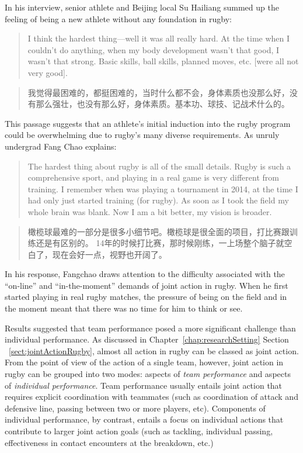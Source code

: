\begin{CJK}{UTF8}{gbsn}
In his interview, senior athlete and Beijing local Su Hailiang summed up the feeling of being a new athlete without any foundation in rugby:

\begin{quote}
    I think the hardest thing---well it was all really hard.  At the time when I couldn't do anything, when my body development wasn't that good, I wasn't that strong.  Basic skills, ball skills, planned moves, etc. [were all not very good].
\end{quote}

\begin{quote}
    我觉得最困难的，都挺困难的，当时什么都不会，身体素质也没那么好，没有那么强壮，也没有那么好，身体素质。基本功、球技、记战术什么的。
\end{quote}

This passage suggests that an athlete's initial induction into the rugby program could be overwhelming due to rugby's many diverse requirements.  As unruly undergrad Fang Chao explains:

\begin{quote}
  The hardest thing about rugby is all of the small details. Rugby is such a comprehensive sport, and playing in a real game is very different from training. I remember when was playing a tournament in 2014, at the time I had only just started training (for rugby).  As soon as I took the field my whole brain was blank.  Now I am a bit better, my vision is broader.
\end{quote}

\begin{quote}
  橄榄球最难的一部分是很多小细节吧。橄榄球是很全面的项目，打比赛跟训练还是有区别的。 14年的时候打比赛，那时候刚练，一上场整个脑子就空白了，现在会好一点，视野也开阔了。
\end{quote}

In his response, Fangchao draws attention to the difficulty associated with the ``on-line'' and ``in-the-moment'' demands of joint action in rugby.  When he first started playing in real rugby matches, the pressure of being on the field and in the moment meant that there was no time for him to think or see.

Results suggested that team performance posed a more significant challenge than individual performance.  As discussed in Chapter~\ref{chap:researchSetting} Section ~\ref{sect:jointActionRugby}, almost all action in rugby can be classed as joint action.  From the point of view of the action of a single team, however, joint action in rugby can be grouped into two modes: aspects of \textit{team performance} and aspects of \textit{individual performance}.  Team performance usually entails joint action that requires explicit coordination with teammates (such as coordination of attack and defensive line, passing between two or more players, etc).  Components of individual performance, by contrast, entails a focus on individual actions that contribute to larger joint action goals (such as tackling, individual passing, effectiveness in contact encounters at the breakdown, etc.)


\end{CJK}
